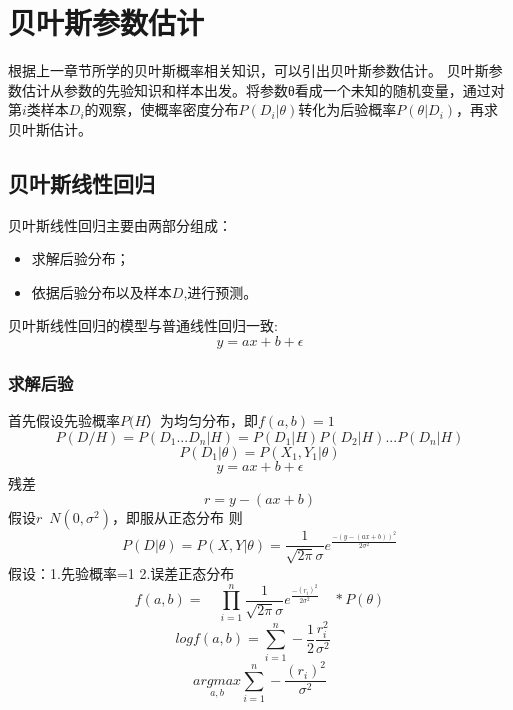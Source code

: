 \chapter{贝叶斯参数估计}

根据上一章节所学的贝叶斯概率相关知识，可以引出贝叶斯参数估计。
贝叶斯参数估计从参数的先验知识和样本出发。将参数θ看成一个未知的随机变量，通过对第$i$类样本$D_i$的观察，使概率密度分布$P(D_i|θ)$转化为后验概率$P(θ|D_i)$，再求贝叶斯估计。

\section{贝叶斯线性回归}
贝叶斯线性回归主要由两部分组成：
\begin{itemize}
    \item 求解后验分布；
    \item 依据后验分布以及样本$D$,进行预测。
\end{itemize}
贝叶斯线性回归的模型与普通线性回归一致:
\begin{equation}
 y=ax+b+\epsilon
\end{equation}

\subsection{求解后验}
首先假设先验概率$P(H）$为均匀分布，即$f(a,b)=1$
\begin{equation}
 P(D/H)=P(D_1...D_n|H)=P(D_1|H)P(D_2|H)...P(D_n|H)
\end{equation}
\begin{equation}
 P(D_1|θ)=P(X_1,Y_1|θ)
\end{equation}
\begin{equation}
 y=ax+b+\epsilon
\end{equation}
残差
\begin{equation}
r=y-(ax+b)
\end{equation}
假设$r$~$N(0,\sigma^2)$，即服从正态分布
则
\begin{equation}
  P(D|θ)=P(X,Y|θ)=\frac{1}{\sqrt{2π}\sigma}e^\frac{-(y-(ax+b))^2}{2\sigma^2}
\end{equation}
假设：1.先验概率=1
      2.误差正态分布
\begin{equation}
f(a,b)=\quad \prod_{i=1}^n \frac{1}{\sqrt{2π}\sigma}e^\frac{-(r_i)^2}{2\sigma^2} \quad*P(θ)
\end{equation}
\begin{equation}
logf(a,b)=\sum_{i=1}^n -\frac{1}{2}\frac{r_i^2}{\sigma^2} \quad
\end{equation} 
\begin{equation}
 \underset{a,b} {argmax }{\sum_{i=1}^n }-\frac{(r_i)^2}{\sigma^2}
\end{equation}

